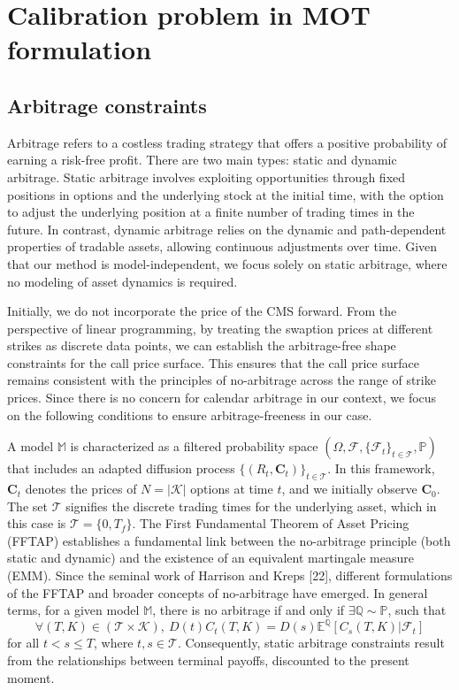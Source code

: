 \chapter{Calibration problem in MOT formulation}
\section{Arbitrage constraints}
Arbitrage refers to a costless trading strategy that offers a positive probability of 
earning a risk-free profit. There are two main types: static and dynamic arbitrage. 
Static arbitrage involves exploiting opportunities through fixed positions in options and the 
underlying stock at the initial time, with the option to adjust the underlying position at a 
finite number of trading times in the future. In contrast, dynamic arbitrage relies on the 
dynamic and path-dependent properties of tradable assets, allowing continuous adjustments over 
time. Given that our method is model-independent, we focus solely on static arbitrage, where no 
modeling of asset dynamics is required.

Initially, we do not incorporate the price of the CMS forward. From the perspective of linear 
programming, by treating the swaption prices at different strikes as discrete data points, 
we can establish the arbitrage-free shape constraints for the call price surface. This ensures 
that the call price surface remains consistent with the principles of no-arbitrage across the 
range of strike prices. Since there is no concern for calendar arbitrage in our context, 
we focus on the following conditions to ensure arbitrage-freeness in our case.

A model \(\mathbb{M}\) is characterized as a filtered probability space 
$(\Omega,\mathcal{F},\{\mathcal{F}_{t}\}_{t\in\mathcal{T}},\mathbb{P})$
that includes an adapted diffusion process \(\{(R_{t},\mathbf{C}_{t})\}_{t\in\mathcal{T}}\). 
In this framework, \(\mathbf{C}_{t}\) denotes the prices of \(N = |\mathcal{K}|\) options at time \(t\), 
and we initially observe \(\mathbf{C}_{0}\). 
The set \(\mathcal{T}\) signifies the discrete trading times for the underlying asset, 
which in this case is \(\mathcal{T} = \{0, T_{f}\}\).
The First Fundamental Theorem of Asset Pricing (FFTAP) establishes a fundamental link between the 
no-arbitrage principle (both static and dynamic) and the existence of an equivalent martingale measure (EMM). 
Since the seminal work of Harrison and Kreps [22], different formulations of the FFTAP and broader concepts 
of no-arbitrage have emerged. In general terms, for a given model \(\mathbb{M}\), there is no arbitrage 
if and only if $\exists \mathbb{Q} \sim \mathbb{P}$, such that
\[
\forall(T,K)\in (\mathcal{T} \times \mathcal{K}),\ D(t)C_{t}(T, K)=D(s)\mathbb{E}^{\mathbb{Q}}[C_{s}(T,K)|\mathcal
{F}_{t}]
\]
for all \(t < s \leq T\), where \(t, s \in \mathcal{T}\). 
Consequently, static arbitrage constraints result from the relationships between terminal payoffs, 
discounted to the present moment.

